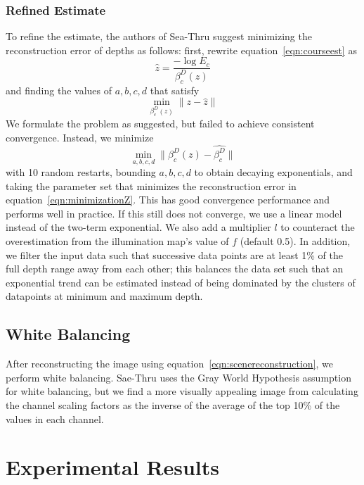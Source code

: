 \documentclass[10pt,twocolumn,letterpaper]{article}
\begin{document}
\subsubsection*{Refined Estimate}
To refine the estimate, the authors of Sea-Thru suggest minimizing the reconstruction error of depths as follows:
first, rewrite equation~\ref{eqn:courseest} as
\begin{equation}
\label{eqn:reconstructedz}
    \hat{z} = \frac{-\log{E_c}}{\beta_c^D(z)}
\end{equation}
and finding the values of $a, b, c, d$ that satisfy
\begin{equation}
\label{eqn:minimizationZ}
    \min_{\beta_c^D(z)} \lVert z - \hat{z} \rVert
\end{equation}
We formulate the problem as suggested, but failed to achieve consistent convergence. Instead, we minimize
\begin{equation}
\label{eqn:minimizationB}
    \min_{a,b,c,d} \lVert \beta_c^D(z) - \hat{\beta_c^D} \rVert
\end{equation}
with 10 random restarts, bounding $a,b,c,d$ to obtain decaying exponentials, and taking the parameter set that
minimizes the reconstruction error in equation~\ref{eqn:minimizationZ}. This has good convergence performance
and performs well in practice. If this still does not converge, we use a linear model instead of the two-term
exponential. We also add a multiplier $l$ to counteract the overestimation from the illumination map's value of
$f$ (default 0.5). In addition, we filter the input data such that successive data points are at least 1\% of the
full depth range away from each other; this balances the data set such that an exponential trend can be estimated
instead of being dominated by the clusters of datapoints at minimum and maximum depth.

\subsection{White Balancing}
After reconstructing the image using equation~\ref{eqn:scenereconstruction}, we perform white balancing.
Sae-Thru uses the Gray World Hypothesis assumption for white balancing, but we find a more visually appealing
image from calculating the channel scaling factors as the inverse of the average of the top 10\% of the values
in each channel.

\section{Experimental Results}
\end{document}
